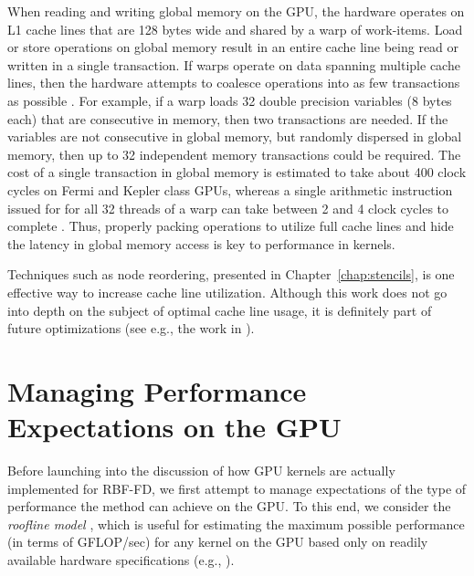 \documentclass{report}
\begin{document}
When reading and writing global memory on the GPU, the hardware operates on L1 cache lines that are 128 bytes wide and shared by a warp of work-items. Load or store operations on global memory result in an entire cache line being read or written in a single transaction. If warps operate on data spanning multiple cache lines, then the hardware attempts to coalesce operations into as few transactions as possible \cite{CudaGuide2013}. For example, if a warp loads 32 double precision variables (8 bytes each) that are consecutive in memory, then two transactions are needed. If the variables are not consecutive in global memory, but randomly dispersed in global memory, then up to 32 independent memory transactions could be required. The cost of a single transaction in global memory is estimated to take about 400 clock cycles on Fermi and Kepler class GPUs, whereas a single arithmetic instruction issued for for all 32 threads of a warp can take between 2 and 4 clock cycles to complete \cite{CudaGuide2013}. Thus, properly packing operations to utilize full cache lines and hide the latency in global memory access is key to performance in kernels. 

Techniques such as node reordering, presented in Chapter~\ref{chap:stencils}, is one effective way to increase cache line utilization. Although this work does not go into depth on the subject of optimal cache line usage, it is definitely part of future optimizations (see e.g., the work in \cite{ErlebacherSauleFlyerBollig2013}). 



\section{Managing Performance Expectations on the GPU}

Before launching into the discussion of how GPU kernels are actually implemented for RBF-FD, we first attempt to manage expectations of the type of performance the method can achieve on the GPU. To this end, we consider the \emph{roofline model} \cite{Williams2009}, which is useful for estimating the maximum possible performance (in terms of GFLOP/sec) for any kernel on the GPU based only on readily available hardware specifications (e.g., \cite{M2070FactSheet, KeplerFactSheet}). 
 
\end{document}
